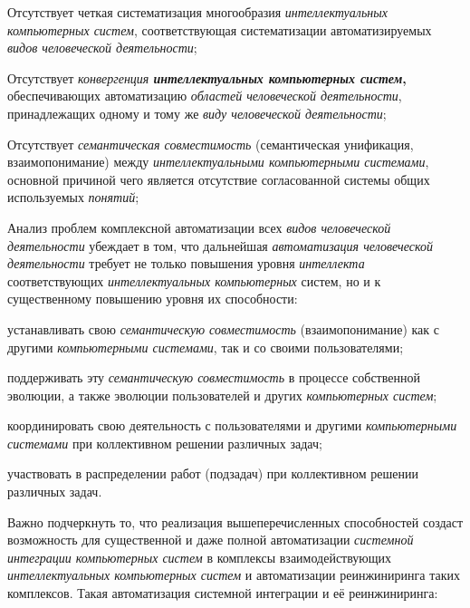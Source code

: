 \begin{textitemize}
	\item
	Отсутствует четкая систематизация многообразия \textit{интеллектуальных компьютерных систем}, соответствующая систематизации автоматизируемых \textit{видов человеческой деятельности};
	\item
	Отсутствует \textit{конвергенция \textbf{интеллектуальных компьютерных систем}}\textbf{,} обеспечивающих автоматизацию \textit{областей человеческой деятельности}, принадлежащих одному и тому же \textit{виду человеческой деятельности};
	\item
	Отсутствует \textit{семантическая совместимость} (семантическая унификация, взаимопонимание) между \textit{интеллектуальными компьютерными системами}, основной причиной чего является отсутствие согласованной системы общих используемых \textit{понятий};
	\item
	Анализ проблем комплексной автоматизации всех \textit{видов человеческой деятельности} убеждает в том, что дальнейшая \textit{автоматизация человеческой деятельности} требует не только повышения уровня \textit{интеллекта} соответствующих \textit{интеллектуальных компьютерных} систем, но и к существенному повышению уровня их способности:
	\begin{textitemize}
		\item
		устанавливать свою \textit{семантическую совместимость} (взаимопонимание) как с другими \textit{компьютерными системами}, так и со своими пользователями;
		\item
		поддерживать эту \textit{семантическую совместимость} в процессе собственной эволюции, а также эволюции пользователей и других \textit{компьютерных систем};
		\item
		координировать свою деятельность с пользователями и другими \textit{компьютерными системами} при коллективном решении различных задач;
		\item
		участвовать в распределении работ (подзадач) при коллективном решении различных задач.
	\end{textitemize}
\end{textitemize}


Важно подчеркнуть то, что реализация вышеперечисленных способностей создаст возможность для существенной и даже полной автоматизации \textit{системной интеграции компьютерных систем} в комплексы взаимодействующих \textit{интеллектуальных компьютерных систем} и автоматизации реинжиниринга таких комплексов. Такая автоматизация системной интеграции и её реинжиниринга:

